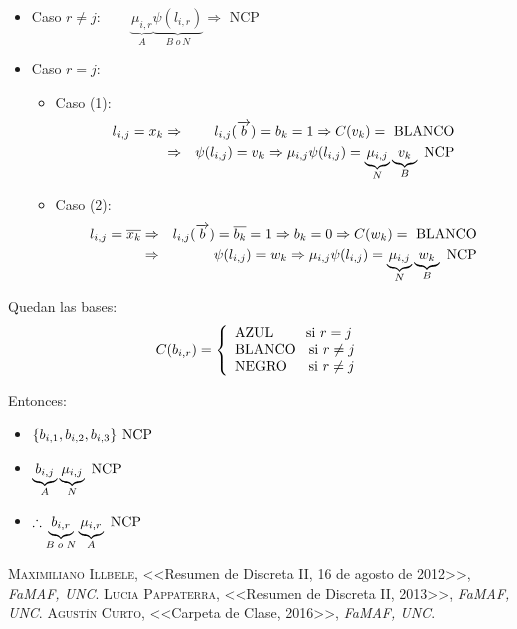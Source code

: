 \documentclass[12pt,a4paper]{report}
\newcounter{neq}
\begin{document}
		\begin{itemize}
			\item Caso $r \neq j : \qquad \underbrace{\mu_{i, r}}_{A} \underbrace{\psi(l_{i, r})}_{B \; o \, N} \Rightarrow$ NCP
			\item Caso $r = j$:
				\begin{itemize}
			\item Caso (1):
				\begin{eqnarray}
						\nonumber l_{i, j} = x_{k} &\Rightarrow & l_{i, j}(\overrightarrow{b}) = b_{k} = 1 \Rightarrow C(v_{k}) = \textup{ BLANCO} \\
						\nonumber &\Rightarrow& \psi(l_{i, j}) = v_{k}	\Rightarrow \mu_{i, j} \psi(l_{i, j}) = \underbrace{\mu_{i, j}}_{N} \underbrace{v_{k}}_{B} \textup{ NCP}
				\end{eqnarray}

			\item Caso (2):
				\begin{eqnarray}
						\nonumber l_{i, j} = \overline{x_{k}} &\Rightarrow & l_{i, j}(\overrightarrow{b}) = \overline{b_{k}} = 1 \Rightarrow b_{k} = 0 \Rightarrow C(w_{k}) = \textup{ BLANCO} \\
						\nonumber &\Rightarrow& \psi(l_{i, j}) = w_{k}	\Rightarrow \mu_{i, j} \psi(l_{i, j}) = \underbrace{\mu_{i, j}}_{N} \underbrace{w_{k}}_{B} \textup{ NCP}
				\end{eqnarray}
			\end{itemize}
		\end{itemize}

	\par Quedan las bases:
		\begin{equation*}
			C(b_{i, r}) =
		  	\left\lbrace
  			\begin{array}{l}
    		 	\textup{AZUL \qquad si } r = j \\
    		 	\textup{BLANCO \; si } r \neq j \\
    		 	\textup{NEGRO \; \; si } r \neq j
  			\end{array}
 			\right.
		\end{equation*}

	Entonces:
	\begin{itemize}
		\item $\lbrace b_{i, 1}, b_{i, 2}, b_{i, 3} \rbrace \textup{ NCP}$
 		\item $\underbrace{b_{i, j}}_{A} \underbrace{\mu_{i, j}}_{N} \textup{ NCP}$
 		\item $\therefore \underbrace{b_{i, r}}_{B \; o \; N} \underbrace{\mu_{i, r}}_{A} \textup{ NCP}$
	\end{itemize}



\begin{thebibliography}{X}
 \textsc{Maximiliano Illbele},
<<Resumen de Discreta II, 16 de agosto de 2012>>,
\textit{FaMAF, UNC}.
 \textsc{Lucia Pappaterra},
<<Resumen de Discreta II, 2013>>,
\textit{FaMAF, UNC}.
 \textsc{Agustín Curto},
<<Carpeta de Clase, 2016>>,
\textit{FaMAF, UNC}.
\end{thebibliography}
\end{document}
